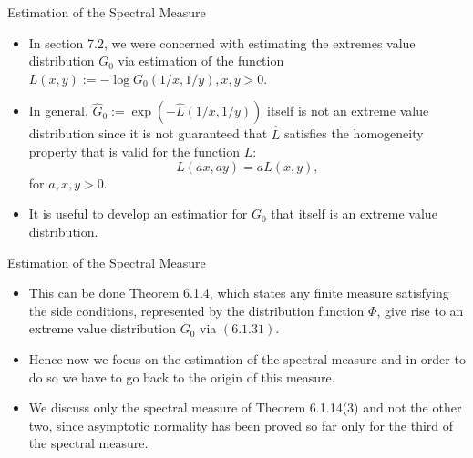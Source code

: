 \documentclass[11pt]{beamer}
\begin{document}
 
\begin{frame}{Estimation of the Spectral Measure}
\begin{itemize}
\item In section 7.2, we were concerned with estimating the extremes value distribution $G_0$ via estimation of the function $L(x,y):=-\log G_0(1/x,1/y), x,y>0$. 
\item In general, $\hat{G}_0:=\exp(-\hat{L}(1/x,1/y))$ itself is not an extreme value distribution since it is not guaranteed that $\hat{L}$ satisfies the homogeneity property that is valid for the function $L$:
\begin{displaymath}
L(ax,ay)=aL(x,y),
\end{displaymath}
for $a,x,y>0.$
\item It is useful to develop an estimatior for $G_0$ that itself is an extreme value distribution.
\end{itemize}
\end{frame}




\begin{frame}{Estimation of the Spectral Measure}
\begin{itemize}
\item This can be done Theorem 6.1.4, which states any finite measure satisfying the side conditions, represented by the distribution function $\Phi$, give rise to an extreme value distribution $G_0$ via $(6.1.31)$.
\item Hence now we focus on the estimation of the spectral measure and in order to do so we have to go back to    the origin of this measure.
\item We discuss only the spectral measure of Theorem 6.1.14(3) and not the other two, since asymptotic normality has been proved so far only for the third of the spectral measure.
\end{itemize}
\end{frame}
\end{document}

